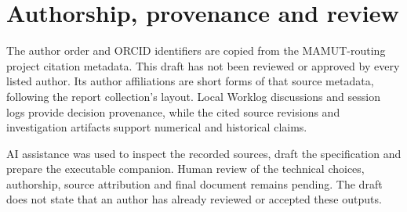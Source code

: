\section*{Authorship, provenance and review}
The author order and ORCID identifiers are copied from the MAMUT-routing project citation metadata. This draft has not been reviewed or approved by every listed author. Its author affiliations are short forms of that source metadata, following the report collection's layout. Local Worklog discussions and session logs provide decision provenance, while the cited source revisions and investigation artifacts support numerical and historical claims.

AI assistance was used to inspect the recorded sources, draft the specification and prepare the executable companion. Human review of the technical choices, authorship, source attribution and final document remains pending. The draft does not state that an author has already reviewed or accepted these outputs.
